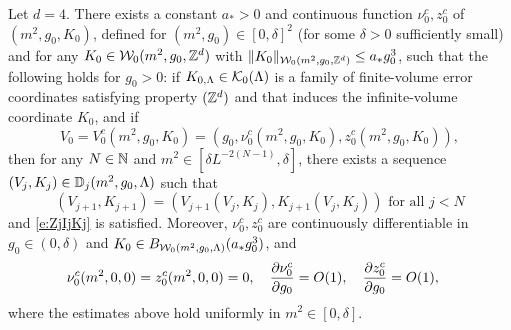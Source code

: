 \begin{theorem}
\label{thm:flow-flow}
Let $d = 4$.
There exists a constant $a_* > 0$ and continuous function $\nu_0^c, z_0^c$
of $(m^2, g_0, K_0)$, defined for $(m^2, g_0) \in [0, \delta]^2$
(for some $\delta > 0$ sufficiently small) and for any $K_0 \in \mathcal{W}_0(m^2, g_0, { {{\mathbb Z}}^d })$
with $\|K_0\|_{\mathcal{W}_0(m^2, g_0, { {{\mathbb Z}}^d })} \leq a_* g_0^3$, such that
the following holds for $g_0 > 0$:
if $K_{0,\Lambda} \in \mathcal{K}_0(\Lambda)$ is a family of finite-volume error
coordinates satisfying property $({ {{\mathbb Z}}^d })$ and that induces the infinite-volume
coordinate $K_0$, and if
\begin{equation}
\label{e:flow-flow-ic}
V_0 = V_0^c(m^2, g_0, K_0) = (g_0, \nu_0^c(m^2,g_0,K_0), z_0^c(m^2,g_0,K_0)),
\end{equation}
then for any $N \in {\mathbb N}$ and $m^2 \in [\delta L^{-2 (N - 1)}, \delta]$,
there exists a sequence $(V_j, K_j) \in \mathbb{D}_j(m^2, g_0, \Lambda)$
such that
\begin{equation}
  \label{e:VjKjDj}
  (V_{j+1},K_{j+1}) = (V_{j+1}(V_j, K_j), K_{j+1}(V_j, K_j)) \text{ for all } j < N
\end{equation}
and \eqref{e:ZjIjKj} is satisfied.
Moreover, $\nu_0^c,z_0^c$ are continuously differentiable in
$g_0 \in (0, \delta)$ and $K_0 \in B_{\mathcal{W}_0(m^2, g_0, \Lambda)}(a_* g_0^3)$, and
\begin{align}
&\nu_0^c(m^2,0,0) = z_0^c(m^2,0,0) = 0,
\quad
\frac{\partial \nu_0^c}{\partial g_0} = O(1),
\quad
\label{e:z0est}
\frac{\partial z_0^c}{\partial g_0} = O(1),
\end{align}
where the estimates above hold uniformly in $m^2 \in [0, \delta]$.
\end{theorem}

